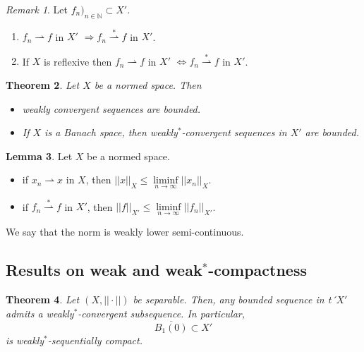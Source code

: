 \documentclass[a4paper, 12pt]{article}
\theoremstyle{plain}
\newtheorem{theorem}{Theorem}[subsection] %
\theoremstyle{definition}
\theoremstyle{lemma}
\newtheorem{lemma}[theorem]{Lemma}
\theoremstyle{remark}
\newtheorem{remark}[theorem]{Remark}
\theoremstyle{corollary}
\theoremstyle{example}
\begin{document}
	\begin{remark}
		Let $f_n)_{n \in \mathbb{N}} \subset X'$. \begin{enumerate}
			\item $f_n \rightharpoonup f$ in $X'$ $\Rightarrow f_n \overset{*}{\rightharpoonup} f$ in $X'$.
			\item If $X$ is reflexive then $f_n \rightharpoonup f$ in $X'$ $\Leftrightarrow f_n \overset{*}{\rightharpoonup} f$ in $X'$.
		\end{enumerate}
	\end{remark}
	\begin{theorem}
		Let $X$ be a normed space. Then \begin{itemize}
			\item weakly convergent sequences are bounded.
			\item If $X$ is a Banach space, then weakly$^*$-convergent sequences in $X'$ are bounded.
		\end{itemize}
	\end{theorem}
	\begin{lemma}
		Let $X$ be a normed space. \begin{itemize}
			\item if $x_n \rightharpoonup x$ in $X$, then $||x||_X \leq \liminf\limits_{n \to \infty} ||x_n||_X$.
			\item if $f_n \overset{*}{\rightharpoonup} f$ in $X'$, then $||f||_{X'} \leq \liminf\limits_{n \to \infty} ||f_n||_{X'}$.
		\end{itemize}
		We say that the norm is weakly lower semi-continuous.
	\end{lemma}
	\subsection{Results on weak and weak$^*$-compactness}
	\begin{theorem}
		Let $(X,||\cdot||)$ be separable. Then, any bounded sequence in t´$X'$ admits a weakly$^*$-convergent subsequence. In particular, \[\overline{B_1(0)} \subset X'\] is weakly$^*$-sequentially compact.
	\end{theorem}
\end{document}

